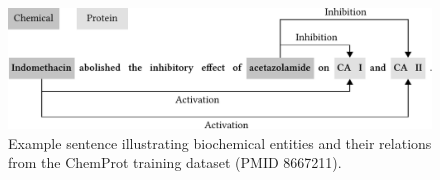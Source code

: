 \begin{figure}[!tb]
\begin{center}
\includegraphics[width=\textwidth]{img/chemprot-example-sentence/v3/img.pdf}
\caption[Example sentence illustrating biochemical entities and their relations.]%
{Example sentence illustrating biochemical entities and their relations from the ChemProt training dataset (PMID 8667211).}
\label{fig:chemprot-example-sentence}
\end{center}
\end{figure}
